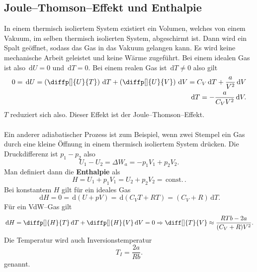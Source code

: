 \documentclass[a4paper,12pt]{article}
\newcommand{\td}{\,\text{d}}
\begin{document}
\subsection{Joule--Thomson--Effekt und Enthalpie}
In einem thermisch isoliertem System existiert ein Volumen, welches von einem Vakuum, im selben thermisch isolierten System, abgeschirmt ist. Dann wird ein Spalt geöffnet, sodass das Gas in das Vakuum gelangen kann. Es wird keine mechanische Arbeit geleistet und keine Wärme zugeführt. Bei einem idealen Gas ist also $\td U=0$ und $\td T=0$. Bei einem realen Gas ist $\td T\neq 0$ also gilt
\begin{align*}
        0=\td U=\left(\diffp[]{U}{T}\right)\td T+\left(\diffp[]{U}{V}\right)\td V=C_V\td T+\dfrac{a}{V^2}\td V\\
        \td T=-\dfrac{a}{C_VV^2}\td V
.\end{align*}
$T$ reduziert sich also. Dieser Effekt ist der Joule--Thomson--Effekt.\\\\
Ein anderer adiabatischer Prozess ist zum Beispiel, wenn zwei Stempel ein Gas durch eine kleine Öffnung in einem thermisch isoliertem System drücken. Die Druckdifferenz ist $p_1-p_2$ also 
\[ 
        U_1-U_2=\Delta W_a=-p_1V_1+p_2V_2
.\] 
Man definiert dann die \textbf{Enthalpie} als 
\[ 
        H=U_1+p_1V_1=U_2+p_2V_2=\,\text{const.}\,
.\] 
Bei konstantem $H$ gilt für ein ideales Gas
\[ 
        \td H=0=\td (U+pV)=\td (C_VT+RT)=(C_V+R)\td T
.\] 
Für ein VdW--Gas gilt
\[ 
        \td H=\diffp[]{H}{T}\td T+\diffp[]{H}{V}\td V=0\Rightarrow \diff[]{T}{V}\approx \dfrac{RTb-2a}{(C_V+R)V^2}
.\] 
Die Temperatur wird auch Inversionstemperatur 
\[ 
        T_I=\dfrac{2a}{Rb}
.\] 
genannt. 
\end{document}
